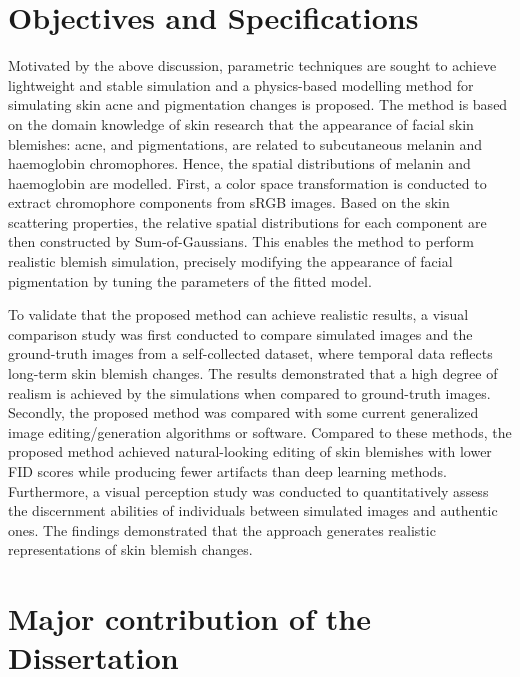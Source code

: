 \begin{spacing}{1.5}
\section{Objectives and Specifications}

Motivated by the above discussion, parametric techniques are sought to achieve lightweight and stable simulation and a physics-based modelling method for simulating skin acne and pigmentation changes is proposed. The method is based on the domain knowledge of skin research that the appearance of facial skin blemishes: acne, and pigmentations, are related to subcutaneous melanin and haemoglobin chromophores. Hence, the spatial distributions of melanin and haemoglobin are modelled. First, a color space transformation is conducted to extract chromophore components from sRGB images. Based on the skin scattering properties, the relative spatial distributions for each component are then constructed by Sum-of-Gaussians. This enables the method to perform realistic blemish simulation, precisely modifying the appearance of facial pigmentation by tuning the parameters of the fitted model.

To validate that the proposed method can achieve realistic results, a visual comparison study was first conducted to compare simulated images and the ground-truth images from a self-collected dataset, where temporal data reflects long-term skin blemish changes. The results demonstrated that a high degree of realism is achieved by the simulations when compared to ground-truth images. Secondly, the proposed method was compared with some current generalized image editing/generation algorithms or software. Compared to these methods, the proposed method achieved natural-looking editing of skin blemishes with lower FID scores while producing fewer artifacts than deep learning methods. Furthermore, a visual perception study was conducted to quantitatively assess the discernment abilities of individuals between simulated images and authentic ones. The findings demonstrated that the approach generates realistic representations of skin blemish changes.


\section{Major contribution of the Dissertation}


\end{spacing}
